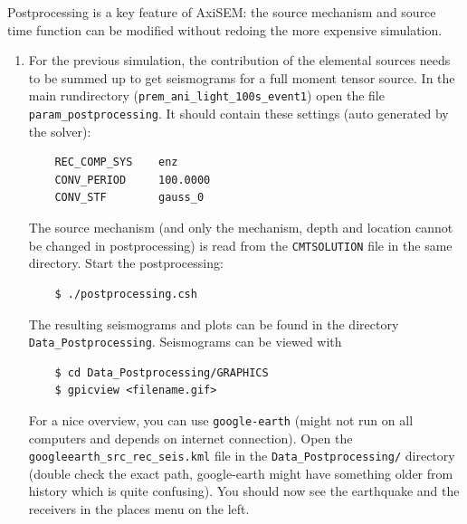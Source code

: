 \documentclass{article}
\begin{document}
Postprocessing is a key feature of AxiSEM: the source mechanism and source time function
can be modified without redoing the more expensive simulation.

\begin{enumerate}
    \item For the previous simulation, the contribution of the elemental sources needs
    to be summed up to get seismograms for a full moment tensor source. In the
    main rundirectory (\verb|prem_ani_light_100s_event1|) open the file
    \verb|param_postprocessing|. It should contain these settings (auto generated by the
    solver):
    \begin{verbatim}
    REC_COMP_SYS    enz
    CONV_PERIOD     100.0000
    CONV_STF        gauss_0
    \end{verbatim}
    The source mechanism (and only the mechanism, depth and location cannot be changed
    in postprocessing) is read from the \verb|CMTSOLUTION| file in the same directory.
    Start the postprocessing:
    \begin{verbatim}
    $ ./postprocessing.csh
    \end{verbatim}
    The resulting seismograms and plots can be found in the directory 
    \verb|Data_Postprocessing|. Seismograms can be viewed with
    \begin{verbatim}
    $ cd Data_Postprocessing/GRAPHICS
    $ gpicview <filename.gif>
    \end{verbatim}
    For a nice overview, you can use \verb|google-earth| (might not run on all computers
    and depends on internet connection). Open the \verb|googleearth_src_rec_seis.kml| file
    in the \verb|Data_Postprocessing/| directory (double check the exact path,
    google-earth might have something older from history which is quite confusing).
    You should now see the earthquake and the receivers in the places menu on the left.
    

\end{enumerate}
\end{document}
